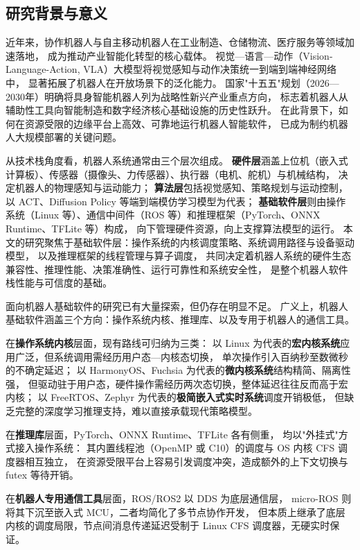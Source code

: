 \subsection{研究背景与意义}

近年来，协作机器人与自主移动机器人在工业制造、仓储物流、医疗服务等领域加速落地，
成为推动产业智能化转型的核心载体。
视觉—语言—动作（Vision-Language-Action, VLA）大模型将视觉感知与动作决策统一到端到端神经网络中，
显著拓展了机器人在开放场景下的泛化能力。
国家"十五五"规划（2026—2030年）明确将具身智能机器人列为战略性新兴产业重点方向，
标志着机器人从辅助性工具向智能制造和数字经济核心基础设施的历史性跃升。
在此背景下，如何在资源受限的边缘平台上高效、可靠地运行机器人智能软件，
已成为制约机器人大规模部署的关键问题。

从技术栈角度看，机器人系统通常由三个层次组成。
\textbf{硬件层}涵盖上位机（嵌入式计算板）、传感器（摄像头、力传感器）、执行器（电机、舵机）与机械结构，
决定机器人的物理感知与运动能力；
\textbf{算法层}包括视觉感知、策略规划与运动控制，
以 ACT\cite{act}、Diffusion Policy\cite{diffusionpolicy} 等端到端模仿学习模型为代表；
\textbf{基础软件层}则由操作系统（Linux 等）、通信中间件（ROS 等）和推理框架（PyTorch、ONNX Runtime、TFLite 等）构成，
向下管理硬件资源，向上支撑算法模型的运行。
本文的研究聚焦于基础软件层：操作系统的内核调度策略、系统调用路径与设备驱动模型，
以及推理框架的线程管理与算子调度，
共同决定着机器人系统的硬件生态兼容性、推理性能、决策准确性、运行可靠性和系统安全性，
是整个机器人软件栈性能与可信度的基础。

面向机器人基础软件的研究已有大量探索，但仍存在明显不足。
广义上，机器人基础软件涵盖三个方向：操作系统内核、推理库、以及专用于机器人的通信工具。

在\textbf{操作系统内核}层面，现有路线可归纳为三类：
以 Linux 为代表的\textbf{宏内核系统}应用广泛，但系统调用需经历用户态—内核态切换，
单次操作引入百纳秒至数微秒的不确定延迟；
以 HarmonyOS、Fuchsia 为代表的\textbf{微内核系统}结构精简、隔离性强，
但驱动驻于用户态，硬件操作需经历两次态切换，整体延迟往往反而高于宏内核；
以 FreeRTOS、Zephyr 为代表的\textbf{极简嵌入式实时系统}调度开销极低，
但缺乏完整的深度学习推理支持，难以直接承载现代策略模型。

在\textbf{推理库}层面，PyTorch、ONNX Runtime、TFLite 各有侧重，
均以"外挂式"方式接入操作系统：
其内置线程池（OpenMP 或 C10）的调度与 OS 内核 CFS 调度器相互独立，
在资源受限平台上容易引发调度冲突，造成额外的上下文切换与 futex 等待开销。

在\textbf{机器人专用通信工具}层面，ROS/ROS2 以 DDS 为底层通信层，
micro-ROS 则将其下沉至嵌入式 MCU，二者均简化了多节点协作开发，
但本质上继承了底层内核的调度局限，节点间消息传递延迟受制于 Linux CFS 调度器，无硬实时保证。

